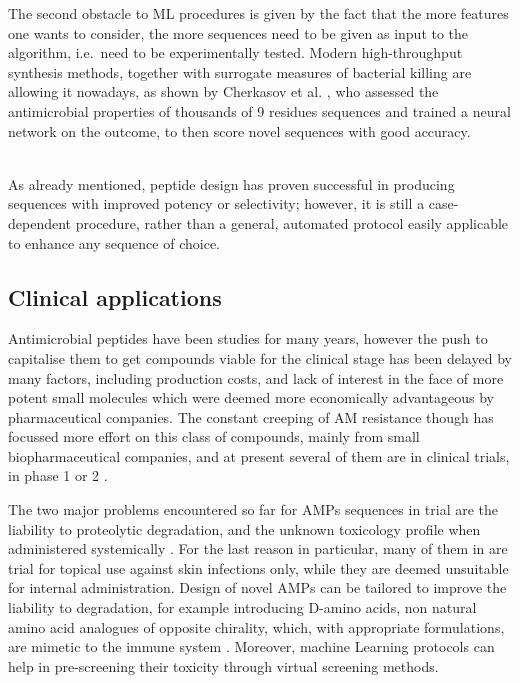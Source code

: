 The second obstacle to ML procedures is given by the fact that the more features one wants to consider, the more sequences need to be given as input to the algorithm, i.e.\ need to be experimentally tested.
%
Modern high-throughput synthesis methods, together with surrogate measures of bacterial killing are allowing it nowadays, as shown by Cherkasov et al. \cite{Cherkasov2009}, who assessed the antimicrobial properties of thousands of 9 residues sequences and trained a neural network on the outcome, to then score novel sequences with good accuracy.

\hspace{0.5cm}
\\
As already mentioned, peptide design has proven successful in producing sequences with improved potency or selectivity; however, it is still a case-dependent procedure, rather than a general, automated protocol easily applicable to enhance any sequence of choice.


\subsection{Clinical applications}
Antimicrobial peptides have been studies for many years, however the push to capitalise them to get compounds viable for the clinical stage has been delayed by many factors, including production costs, and lack of interest in the face of more potent small molecules which were deemed more economically advantageous by pharmaceutical companies.
%
The constant creeping of AM resistance though has focussed more effort on this class of compounds, mainly from small biopharmaceutical companies, and at present several of them are in clinical trials, in phase 1 or 2 \cite{Naafs2018}.

The two major problems encountered so far for AMPs sequences in trial are the liability to proteolytic degradation, and the unknown toxicology profile when administered systemically \cite{Hancock2006}. For the last reason in particular, many of them in are trial for topical use against skin infections only, while they are deemed unsuitable for internal administration.
%
Design of novel AMPs can be tailored to improve the liability to degradation, for example introducing D-amino acids, non natural amino acid analogues of opposite chirality, which, with appropriate formulations, are mimetic to the immune system \cite{Wipf2009}. Moreover, machine Learning protocols can help in pre-screening their toxicity through virtual screening methods.

